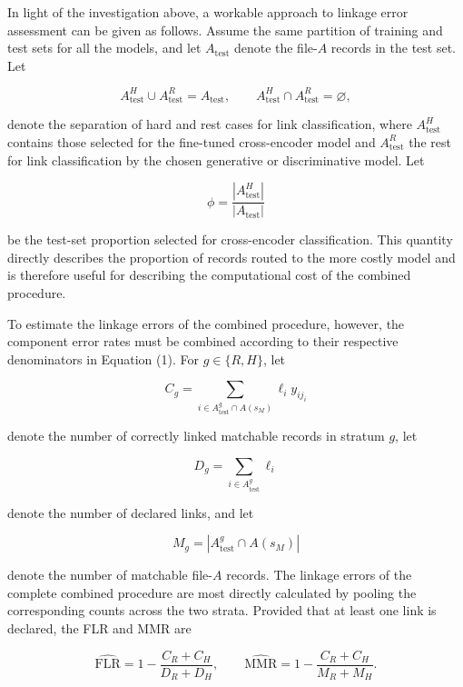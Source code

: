 In light of the investigation above, a workable approach to linkage error assessment can
be given as follows. Assume the same partition of training and test sets for all the models,
and let $A_{\mathrm{test}}$ denote the file-$A$ records in the test set. Let

\[
A_{\mathrm{test}}^H \cup A_{\mathrm{test}}^R
=
A_{\mathrm{test}},
\qquad
A_{\mathrm{test}}^H \cap A_{\mathrm{test}}^R
=
\varnothing,
\]

denote the separation of hard and rest cases for link classification, where
$A_{\mathrm{test}}^H$ contains those selected for the fine-tuned cross-encoder model and
$A_{\mathrm{test}}^R$ the rest for link classification by the chosen generative or
discriminative model.  Let

\[
\phi
=
\frac{|A_{\mathrm{test}}^H|}
{|A_{\mathrm{test}}|}
\]

be the test-set proportion selected for cross-encoder classification. This quantity directly
describes the proportion of records routed to the more costly model and is therefore useful
for describing the computational cost of the combined procedure.

To estimate the linkage errors of the combined procedure, however, the component error
rates must be combined according to their respective denominators in Equation (1).
For $g\in\{R,H\}$, let

\[
C_g
=
\sum_{i\in A_{\mathrm{test}}^g\cap A(s_M)}
\ell_i y_{ij_i}
\]

denote the number of correctly linked matchable records in stratum $g$, let

\[
D_g
=
\sum_{i\in A_{\mathrm{test}}^g}\ell_i
\]

denote the number of declared links, and let

\[
M_g
=
|A_{\mathrm{test}}^g\cap A(s_M)|
\]

denote the number of matchable file-$A$ records. The linkage errors of the complete combined procedure are most directly
calculated by pooling the corresponding counts across the two strata. Provided that
at least one link is declared, the FLR and MMR are

\begin{equation}
\label{eq:combined-errors}
\widehat{\mathrm{FLR}}
=
1-\frac{C_R+C_H}{D_R+D_H},
\qquad
\widehat{\mathrm{MMR}}
=
1-\frac{C_R+C_H}{M_R+M_H}.
\end{equation}

